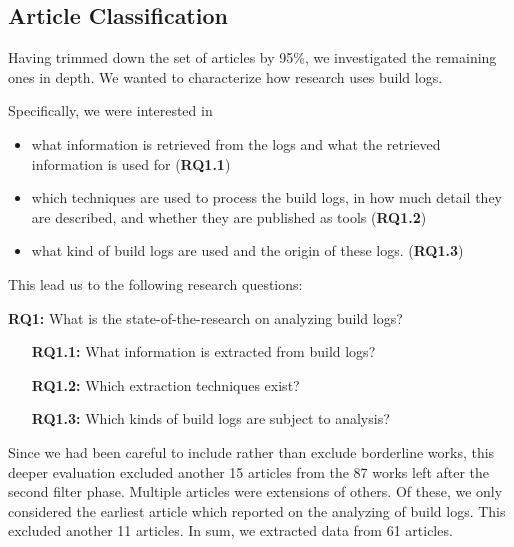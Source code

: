 \subsection{Article Classification}
Having trimmed down the set of articles by 95\%, we investigated the
remaining ones in depth.
We wanted to characterize how research uses build logs.

Specifically, we were interested in
\begin{itemize}
  \item what information is retrieved from the logs and
  what the retrieved information is used for (\textbf{RQ1.1})
  \item which techniques are used to process the build logs,
  in how much detail they are described, and whether they are published
  as tools (\textbf{RQ1.2})
  \item what kind of build logs are used and the origin of these
  logs.
(\textbf{RQ1.3})
\end{itemize}

This lead us to the following research questions:
\begin{simplebox}[attach boxed title to top center={yshift=-6mm}]
{\textbf{RQ1:} What is the state-of-the-research on analyzing build logs?}
\begin{itemize}[leftmargin=1cm]
  \item[\textbf{RQ1.1:}] What information is extracted from build logs?
  \item[\textbf{RQ1.2:}] Which extraction techniques exist?
  \item[\textbf{RQ1.3:}] Which kinds of build logs are subject to
  analysis?
\end{itemize}
\end{simplebox}

Since we had been careful to include rather than exclude borderline
works, this deeper evaluation excluded another 15 articles from the 87
works left after the second filter phase.
Multiple articles were extensions of others.
Of these, we only considered the earliest article which reported on
the analyzing of build logs.
This excluded another 11 articles.
In sum, we extracted data from 61 articles.

